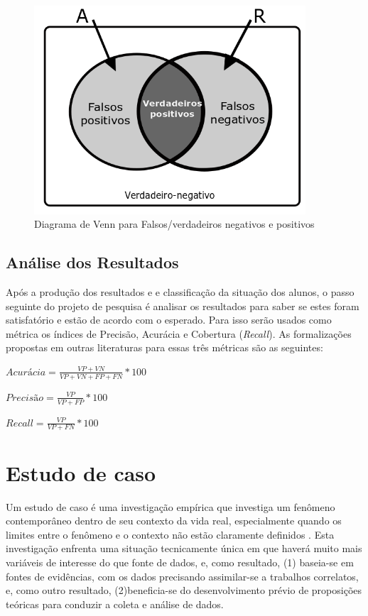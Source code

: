 \documentclass[
	12pt,				%
	openright,			%
	oneside,
	a4paper,			%
	english,			%
	french,				%
	spanish,			%
	brazil,				%
	]{abntex2}
\begin{document}
\begin{figure}
    \centering
    \includegraphics[width=0.9\textwidth]{Modelo_Projeto_Pesquisa_UFG_REJ_BCC/DiagramaVenn.png}
    \caption{Diagrama de Venn para Falsos/verdadeiros negativos e positivos}
    \label{fig:Venn}
\end{figure}

\subsection{Análise dos Resultados}
\label{ss:analise}
Após a produção dos resultados e e classificação da situação dos alunos, o passo seguinte do projeto de pesquisa é analisar os resultados para saber se estes foram satisfatório e estão de acordo com o esperado. Para isso serão usados como métrica os índices de Precisão, Acurácia e Cobertura (\textit{Recall}). As formalizações propostas em outras literaturas para essas três métricas são as seguintes:


$Acurácia = \frac{VP+VN}{VP+VN+FP+FN}*100$

$Precisão = \frac{VP}{VP+FP}*100$

$\textit{Recall} = \frac{VP}{VP+FN}*100$

\section{Estudo de caso}
\label{sec:estudo}
Um estudo de caso é uma investigação empírica que investiga um fenômeno contemporâneo dentro de seu contexto da vida real, especialmente quando os limites entre o fenômeno e o contexto não estão claramente definidos \cite{yin2001planejamento}. Esta investigação enfrenta uma situação tecnicamente única em que haverá muito mais variáveis de interesse do que fonte de dados, e, como resultado, (1) baseia-se em fontes de evidências, com os dados precisando assimilar-se a trabalhos correlatos, e, como outro resultado, (2)beneficia-se do desenvolvimento prévio de proposições teóricas para conduzir a coleta e análise de dados.
\end{document}
